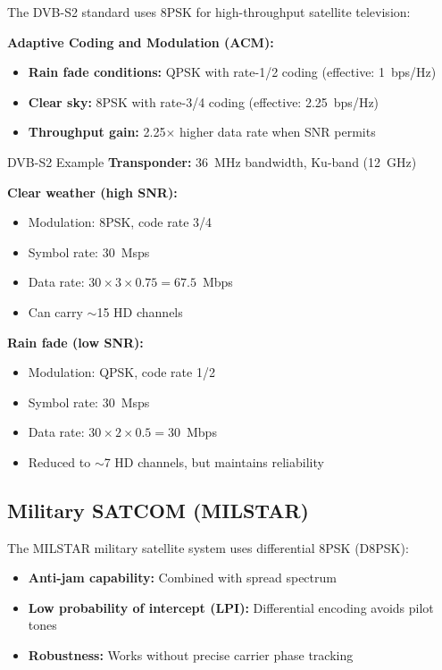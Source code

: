 The DVB-S2 standard uses 8PSK for high-throughput satellite television:

\textbf{Adaptive Coding and Modulation (ACM):}
\begin{itemize}
\item \textbf{Rain fade conditions:} QPSK with rate-1/2 coding (effective: 1~bps/Hz)
\item \textbf{Clear sky:} 8PSK with rate-3/4 coding (effective: 2.25~bps/Hz)
\item \textbf{Throughput gain:} 2.25$\times$ higher data rate when SNR permits
\end{itemize}

\begin{calloutbox}{DVB-S2 Example}
\textbf{Transponder:} 36~MHz bandwidth, Ku-band (12~GHz)

\textbf{Clear weather (high SNR):}
\begin{itemize}
\item Modulation: 8PSK, code rate 3/4
\item Symbol rate: 30~Msps
\item Data rate: $30 \times 3 \times 0.75 = 67.5$~Mbps
\item Can carry $\sim$15 HD channels
\end{itemize}

\textbf{Rain fade (low SNR):}
\begin{itemize}
\item Modulation: QPSK, code rate 1/2
\item Symbol rate: 30~Msps
\item Data rate: $30 \times 2 \times 0.5 = 30$~Mbps
\item Reduced to $\sim$7 HD channels, but maintains reliability
\end{itemize}
\end{calloutbox}

\subsection{Military SATCOM (MILSTAR)}

The MILSTAR military satellite system uses differential 8PSK (D8PSK):
\begin{itemize}
\item \textbf{Anti-jam capability:} Combined with spread spectrum
\item \textbf{Low probability of intercept (LPI):} Differential encoding avoids pilot tones
\item \textbf{Robustness:} Works without precise carrier phase tracking
\end{itemize}

